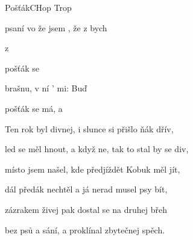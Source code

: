 \setcounter{page}{68}
\begin{song}{Pošťák}{C}{Hop Trop}
\begin{SBVerse}

psaní vo  že jsem , že z  bych 

z 

pošťák se 


brašnu, v ní ' mi: Buď 
\end{SBVerse}
\begin{SBChorus}


pošťák se má, a 

  \end{SBChorus}
\begin{SBVerse}
Ten rok byl divnej, i slunce si přišlo ňák dřív,

led se měl hnout, a když ne, tak to stal by se div,

místo jsem našel, kde předjíždět Kobuk měl jít,

dál předák nechtěl a já nerad musel psy bít,

zázrakem živej pak dostal se na druhej břeh

bez psů a sání, a proklínal zbytečnej spěch.
\end{SBVerse}
\end{song}

\pagebreak
